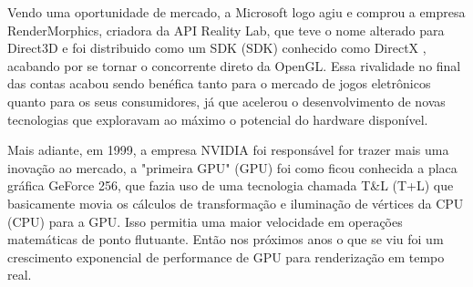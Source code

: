Vendo uma oportunidade de mercado, a Microsoft logo agiu e comprou a empresa RenderMorphics, criadora da \acrshort{API} Reality Lab, que teve o nome alterado para Direct3D e foi distribuido como um SDK (\acrlong{SDK}) conhecido como DirectX \cite{openGLBook}, acabando por se tornar o concorrente direto da \acrshort{OpenGL}. Essa rivalidade no final das contas acabou sendo benéfica tanto para o mercado de jogos eletrônicos quanto para os seus consumidores, já que acelerou o desenvolvimento de novas tecnologias que exploravam ao máximo o potencial do hardware disponível.
	
Mais adiante, em 1999, a empresa NVIDIA foi responsável for trazer mais uma inovação ao mercado, a "primeira GPU" (\acrlong{GPU}) foi como ficou conhecida a placa gráfica GeForce 256, que fazia uso de uma tecnologia chamada T\&L (\acrlong{T+L}) que basicamente movia os cálculos de transformação e iluminação de vértices da CPU (\acrlong{CPU}) para a \acrshort{GPU}. Isso permitia uma maior velocidade em operações matemáticas de ponto flutuante. Então nos próximos anos o que se viu foi um crescimento exponencial de performance de \acrshort{GPU} para renderização em tempo real.

